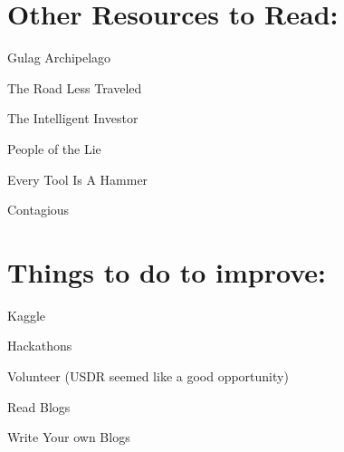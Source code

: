 \documentclass[12pt]{article}
\begin{document}
\section*{Other Resources to Read:}
\begin{description}
    \item Gulag Archipelago
    \item The Road Less Traveled
    \item The Intelligent Investor
    \item People of the Lie
    \item Every Tool Is A Hammer
    \item Contagious
\end{description}


\section*{Things to do to improve:}
\begin{description}
    \item Kaggle
    \item Hackathons
    \item Volunteer (USDR seemed like a good opportunity)
    \item Read Blogs
    \item Write Your own Blogs
\end{description}
\end{document}
